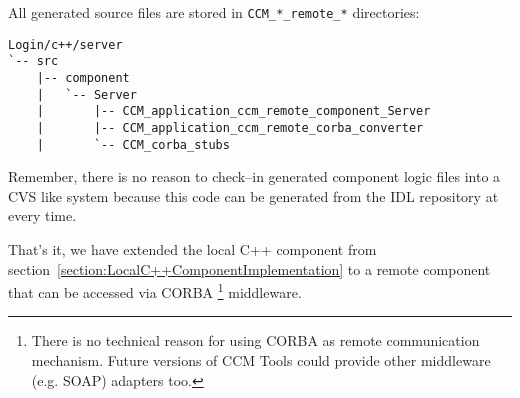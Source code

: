 All generated source files are stored in {\tt CCM\_*\_remote\_*} directories:
\begin{footnotesize}
\begin{verbatim}
Login/c++/server
`-- src
    |-- component
    |   `-- Server
    |       |-- CCM_application_ccm_remote_component_Server
    |       |-- CCM_application_ccm_remote_corba_converter
    |       `-- CCM_corba_stubs
\end{verbatim}
\end{footnotesize}

Remember, there is no reason to check--in generated component logic files into a
CVS like system because this code can be generated from the IDL repository
at every time.

\vspace{3mm}
That's it, we have extended the local C++ component from 
section~\ref{section:LocalC++ComponentImplementation} to a remote component 
that can be accessed via CORBA
\footnote{
There is no technical reason for using CORBA as remote communication mechanism.
Future versions of CCM Tools could provide other middleware (e.g. SOAP)
adapters too. } 
middleware.

